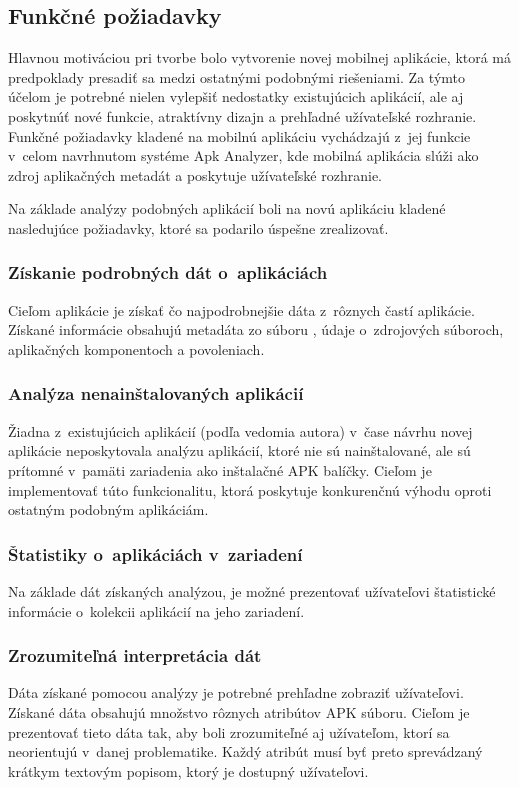 \subsection{Funkčné požiadavky}
Hlavnou motiváciou pri tvorbe bolo vytvorenie novej mobilnej aplikácie, ktorá má predpoklady presadiť sa medzi ostatnými podobnými riešeniami.  Za týmto účelom je potrebné nielen vylepšiť nedostatky existujúcich aplikácií, ale aj poskytnúť nové funkcie, atraktívny dizajn a prehľadné užívateľské rozhranie.
Funkčné požiadavky kladené na mobilnú aplikáciu vychádzajú z~jej funkcie v~celom navrhnutom systéme Apk Analyzer, kde mobilná aplikácia slúži ako zdroj aplikačných metadát a poskytuje užívateľské rozhranie.


Na základe analýzy podobných aplikácií boli na novú aplikáciu kladené nasledujúce požiadavky, ktoré sa podarilo úspešne zrealizovať.

\subsubsection{\textbf{Získanie podrobných dát o~aplikáciách}}
Cieľom aplikácie je získať čo najpodrobnejšie dáta z~rôznych častí aplikácie. Získané informácie obsahujú metadáta zo súboru , údaje o~zdrojových súboroch, aplikačných komponentoch a povoleniach. 

\subsubsection{\textbf{Analýza nenainštalovaných aplikácií}}
Žiadna z~existujúcich aplikácií (podľa vedomia autora) v~čase návrhu novej aplikácie neposkytovala analýzu aplikácií, ktoré nie sú nainštalované, ale sú prítomné v~pamäti zariadenia ako inštalačné APK balíčky. Cieľom je implementovať túto funkcionalitu, ktorá poskytuje konkurenčnú výhodu oproti ostatným podobným aplikáciám.

\subsubsection{\textbf{Štatistiky o~aplikáciách v~zariadení}}
Na základe dát získaných analýzou, je možné prezentovať užívateľovi štatistické informácie o~kolekcii aplikácií na jeho zariadení.

\subsubsection{\textbf{Zrozumiteľná interpretácia dát}}
Dáta získané pomocou analýzy je potrebné prehľadne zobraziť užívateľovi.  Získané dáta obsahujú množstvo rôznych atribútov APK súboru. Cieľom je prezentovať tieto dáta tak, aby boli zrozumiteľné aj užívateľom, ktorí sa neorientujú v~danej problematike. Každý atribút musí byť preto sprevádzaný krátkym textovým popisom, ktorý je dostupný užívateľovi.

